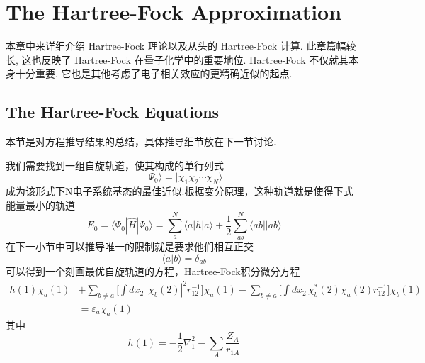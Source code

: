 \documentclass[fontset=none,12pt,a4paper]{ctexart}
\numberwithin{equation}{section}
\begin{document}
\section{The Hartree-Fock Approximation}
本章中来详细介绍 Hartree-Fock 理论以及从头的 Hartree-Fock 计算.
 此章篇幅较长, 这也反映了 Hartree-Fock 在量子化学中的重要地位. 
 Hartree-Fock 不仅就其本身十分重要, 它也是其他考虑了电子相关效应的更精确近似的起点.
\subsection{The Hartree-Fock Equations}
本节是对方程推导结果的总结，具体推导细节放在下一节讨论.

我们需要找到一组自旋轨道，使其构成的单行列式
\begin{equation}
  |\Psi_0 \rangle=|\chi_1\chi_2\cdots\chi_N\rangle
\end{equation}
成为该形式下N电子系统基态的最佳近似.根据变分原理，这种轨道就是使得下式能量最小的轨道
\begin{equation}
  E_0=\langle \Psi_0|\hat{H}|\Psi_0\rangle
  =\sum_a^{N}\langle a|h|a\rangle + \frac{1}{2}\sum_{ab}^{N}\langle ab||ab\rangle
\end{equation}
在下一小节中可以推导唯一的限制就是要求他们相互正交
\begin{equation}
  \langle a|b\rangle=\delta_{ab}
\end{equation}
可以得到一个刻画最优自旋轨道的方程，Hartree-Fock积分微分方程
\begin{equation}
  \begin{split}
    h(1)\chi_a(1)&+\sum_{b\neq a}\biggl[\int dx_2\,|\chi_b(2)|^2 r_{12}^{-1}\biggr]\chi_a(1) -\sum_{b\neq a}\biggl[\int dx_2\,\chi_b^*(2)\chi_a(2) r_{12}^{-1}\biggr]\chi_b(1) \\
    &=\varepsilon_a\chi_a(1)
  \end{split}
  \label{eq:hf-diff}
\end{equation}
其中
\begin{equation}
  h(1)=-\frac{1}{2}\nabla_1^2-\sum_{A}\frac{Z_A}{r_{1A}}
\end{equation}
\end{document}
